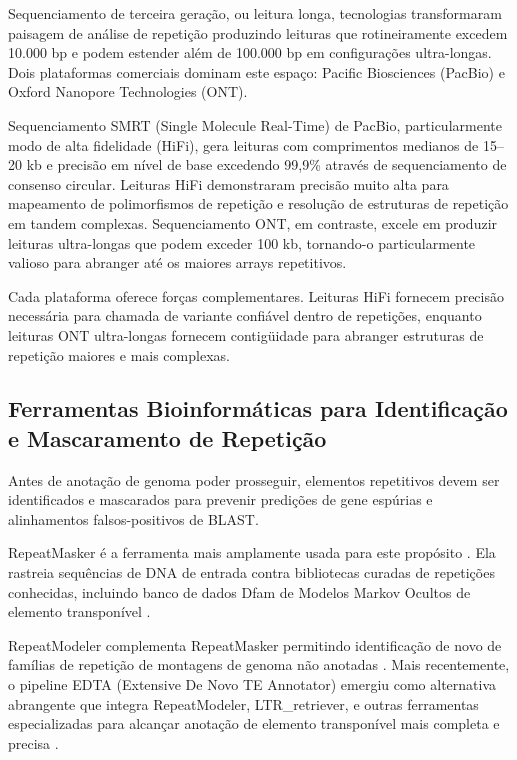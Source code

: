 Sequenciamento de terceira geração, ou leitura longa, tecnologias transformaram paisagem de análise de repetição produzindo leituras que rotineiramente excedem 10.000 bp e podem estender além de 100.000 bp em configurações ultra-longas. Dois plataformas comerciais dominam este espaço: Pacific Biosciences (PacBio) e Oxford Nanopore Technologies (ONT).

Sequenciamento SMRT (Single Molecule Real-Time) de PacBio, particularmente modo de alta fidelidade (HiFi), gera leituras com comprimentos medianos de 15--20 kb e precisão em nível de base excedendo 99,9\% através de sequenciamento de consenso circular. Leituras HiFi demonstraram precisão muito alta para mapeamento de polimorfismos de repetição e resolução de estruturas de repetição em tandem complexas. Sequenciamento ONT, em contraste, excele em produzir leituras ultra-longas que podem exceder 100 kb, tornando-o particularmente valioso para abranger até os maiores arrays repetitivos.

Cada plataforma oferece forças complementares. Leituras HiFi fornecem precisão necessária para chamada de variante confiável dentro de repetições, enquanto leituras ONT ultra-longas fornecem contigüidade para abranger estruturas de repetição maiores e mais complexas.

\subsection{Ferramentas Bioinformáticas para Identificação e Mascaramento de Repetição}

Antes de anotação de genoma poder prosseguir, elementos repetitivos devem ser identificados e mascarados para prevenir predições de gene espúrias e alinhamentos falsos-positivos de BLAST.

RepeatMasker é a ferramenta mais amplamente usada para este propósito \parencite{smit2013}. Ela rastreia sequências de DNA de entrada contra bibliotecas curadas de repetições conhecidas, incluindo banco de dados Dfam de Modelos Markov Ocultos de elemento transponível \parencite{storer2021}.

RepeatModeler complementa RepeatMasker permitindo identificação de novo de famílias de repetição de montagens de genoma não anotadas \parencite{flynn2020}. Mais recentemente, o pipeline EDTA (Extensive De Novo TE Annotator) emergiu como alternativa abrangente que integra RepeatModeler, LTR\_retriever, e outras ferramentas especializadas para alcançar anotação de elemento transponível mais completa e precisa \parencite{ou2019}.


